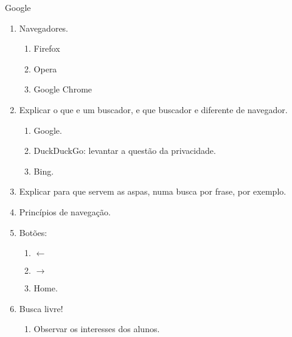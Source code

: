 {\LARGE Google}

\begin{enumerate}
	\item Navegadores.
	\begin{enumerate}
		\item Firefox
		\item Opera
		\item Google Chrome
	\end{enumerate}
	\item Explicar o que e um buscador, e que buscador e diferente de navegador.
	\begin{enumerate}
		\item Google.
		\item DuckDuckGo: levantar a questão da privacidade.
		\item Bing.
	\end{enumerate}	
	\item Explicar para que servem as aspas, numa busca por frase, por exemplo.
	\item Princípios de navegação.
	\item Botões:
	\begin{enumerate}
		\item \textbf{\LARGE $\leftarrow$}
		\item \textbf{\LARGE $\rightarrow$}
		\item Home.
	\end{enumerate}
	\item Busca livre!
	\begin{enumerate}
		\item Observar os interesses dos alunos.
	\end{enumerate}
\end{enumerate}